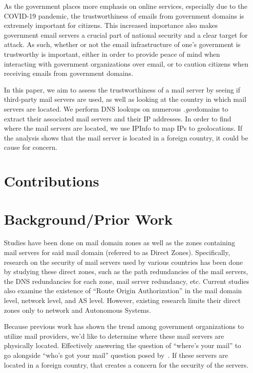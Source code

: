 \documentclass{hotnets21}
\newcommand{\dotgov}{\textit{.gov}\space}
\begin{document}
As the government places more emphasis on online services, especially due to the COVID-19 pandemic, the trustworthiness of emails from government domains is extremely important for citizens.
This increased importance also makes government email servers a crucial part of national security and a clear target for attack.
As such, whether or not the email infrastructure of one’s government is trustworthy is important, either in order to provide peace of mind when interacting with government organizations over email, or to caution citizens when receiving emails from government domains.

In this paper, we aim to assess the trustworthiness of a mail server by seeing if third-party mail servers are used, as well as looking at the country in which mail servers are located.
We perform DNS lookups on numerous \dotgov domains to extract their associated mail servers and their IP addresses.
In order to find where the mail servers are located, we use IPInfo to map IPs to geolocations. If the analysis shows that the mail server is located in a foreign country, it could be cause for concern.

\section{Contributions}



\section{Background/Prior Work}

Studies have been done on mail domain zones as well as the zones containing mail servers for said mail domain (referred to as Direct Zones).
Specifically, research on the security of mail servers used by various countries has been done by studying these direct zones, such as the path redundancies of the mail servers, the DNS redundancies for each zone, mail server redundancy, etc.
Current studies also examine the existence of “Route Origin Authorization” in the mail domain level, network level, and AS level.
However, existing research limits their direct zones only to network and Autonomous Systems.

Because previous work has shown the trend among government organizations to utilize mail providers, we’d like to determine where these mail servers are physically located.
Effectively answering the question of “where’s your mail” to go alongside “who’s got your mail” question posed by~\cite{liu}.
If these servers are located in a foreign country, that creates a concern for the security of the servers.
\end{document}
